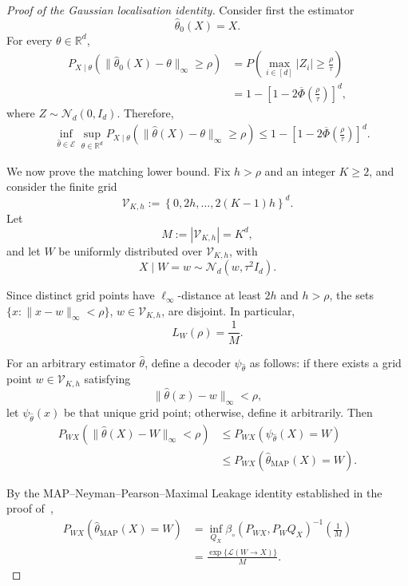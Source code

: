 \documentclass[11pt]{article}
\theoremstyle{definition}
\theoremstyle{remark}
\newcommand{\1}{\boldsymbol{1}}
\newcommand{\ml}[2]{\mathcal{L}(#1\!\to\!#2)}
\begin{document}
\iffalse 
\begin{proof}[Proof of the Gaussian localisation identity]
Consider first the estimator
\[
\widehat\theta_0(X)=X.
\]
For every $\theta\in\mathbb R^d$,
\begin{align}
P_{X\mid\theta}
\left(
\|\widehat\theta_0(X)-\theta\|_\infty\geq\rho
\right)
&=
P
\left(
\max_{i\in[d]}|Z_i|
\geq
\frac{\rho}{\tau}
\right)\\
&=
1-
\left[
1-2\overline\Phi\left(\frac{\rho}{\tau}\right)
\right]^d,
\end{align}
where $Z\sim\mathcal N_d(0,I_d)$. Therefore,
\begin{align}
&\inf_{\widehat\theta\in\mathcal E}
\sup_{\theta\in\mathbb R^d}
P_{X\mid\theta}
\left(
\|\widehat\theta(X)-\theta\|_\infty\geq\rho
\right)\leq
1-
\left[
1-2\overline\Phi\left(\frac{\rho}{\tau}\right)
\right]^d.
\label{eq:gaussianLinftyUpperBound}
\end{align}

We now prove the matching lower bound. Fix $h>\rho$ and an integer
$K\geq2$, and consider the finite grid
\begin{equation}
\mathcal V_{K,h}
:=
\left\{
0,2h,\ldots,2(K-1)h
\right\}^d.
\label{eq:gaussianGrid}
\end{equation}
Let
\[
M:=|\mathcal V_{K,h}|=K^d,
\]
and let $W$ be uniformly distributed over $\mathcal V_{K,h}$, with
\[
X\mid W=w
\sim
\mathcal N_d(w,\tau^2I_d).
\]

Since distinct grid points have $\ell_\infty$-distance at least $2h$
and $h>\rho$, the sets
$\{x:\|x-w\|_\infty<\rho\}$, $w\in\mathcal V_{K,h}$, are disjoint. In particular,
\begin{equation}
L_W(\rho)=\frac1M.
\end{equation}

For an arbitrary estimator $\widehat\theta$, define a decoder
$\psi_{\widehat\theta}$ as follows: if there exists a grid point
$w\in\mathcal V_{K,h}$ satisfying
\[
\|\widehat\theta(x)-w\|_\infty<\rho,
\]
let $\psi_{\widehat\theta}(x)$ be that unique grid point; otherwise,
define it arbitrarily. Then
\begin{align}
P_{WX}
\left(
\|\widehat\theta(X)-W\|_\infty<\rho
\right)
&\leq
P_{WX}
\left(
\psi_{\widehat\theta}(X)=W
\right)\\
&\leq
P_{WX}
\left(
\widehat\theta_{\mathrm{MAP}}(X)=W
\right).
\label{eq:gaussianSuccessToMAP}
\end{align}

By the MAP--Neyman--Pearson--Maximal Leakage identity established in
the proof of~,
\begin{align}
P_{WX}
\left(
\widehat\theta_{\mathrm{MAP}}(X)=W
\right)
&=
\inf_{Q_X}
\beta_{\circ}(P_{WX},P_WQ_X)^{-1}
\left(\frac1M\right)
\label{eq:gaussianMAPNPEquality}\\
&=
\frac{\exp\{\ml{W}{X}\}}{M}.
\label{eq:gaussianMAPLeakageEquality}
\end{align}


\end{proof}
\end{document}
